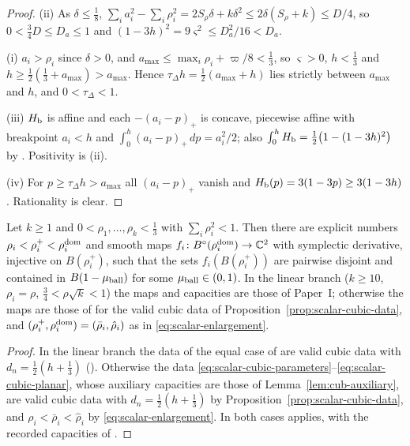 \begin{proof}
(ii) As $\delta\le\frac18$, $\sum_ia_i^2-\sum_i\rho_i^2=2S_\rho\delta+k\delta^2\le2\delta(S_\rho+k)\le D/4$, so $0<\frac34D\le D_a\le1$ and $(1-3h)^2=9\varsigma^2\le D_a^2/16<D_a$.

(i) $a_i>\rho_i$ since $\delta>0$, and $a_{\max}\le\max_i\rho_i+\varpi/8<\frac13$, so $\varsigma>0$, $h<\frac13$ and $h\ge\frac12(\frac13+a_{\max})>a_{\max}$. Hence $\tau_\Delta h=\frac12(a_{\max}+h)$ lies strictly between $a_{\max}$ and $h$, and $0<\tau_\Delta<1$.

(iii) $H_{\mathrm b}$ is affine and each $-(a_i-p)_+$ is concave, piecewise affine with breakpoint $a_i<h$ and $\int_0^h(a_i-p)_+\,dp=a_i^2/2$; also $\int_0^hH_{\mathrm b}=\frac12\big(1-(1-3h)^2\big)$ by . Positivity is (ii).

(iv) For $p\ge\tau_\Delta h>a_{\max}$ all $(a_i-p)_+$ vanish and $H_{\mathrm b}(p)=3(1-3p)\ge3(1-3h)$. Rationality is clear.
\end{proof}

\begin{theorem}\label{thm:cub-packing-general}
Let $k\ge1$ and $0<\rho_1,\dots,\rho_k<\frac13$ with $\sum_i\rho_i^2<1$. Then there are explicit numbers
$\rho_i<\rho_i^+<\rho_i^{\rm dom}$ and smooth maps $f_i\colon B^{\circ}(\rho_i^{\rm dom})\to\mathbb{C}^2$ with symplectic derivative,
injective on $B(\rho_i^+)$, such that the sets $f_i(B(\rho_i^+))$ are pairwise disjoint and contained in
$B(1-\mu_{\rm ball})$ for some $\mu_{\rm ball}\in(0,1)$. In the linear branch ($k\ge10$, $\rho_i=\rho$,
$\frac34<\rho\sqrt k<1$) the maps and capacities are those of Paper~I; otherwise the maps are those of
 for the valid cubic data of Proposition~\ref{prop:scalar-cubic-data}, and
$(\rho_i^+,\rho_i^{\rm dom})=(\bar\rho_i,\hat\rho_i)$ as in \eqref{eq:scalar-enlargement}.
\end{theorem}

\begin{proof}
In the linear branch the data of the equal case of  are valid cubic data with
$d_n=\frac12(h+\frac13)$ (). Otherwise the data
\eqref{eq:scalar-cubic-parameters}--\eqref{eq:scalar-cubic-planar}, whose auxiliary capacities are those of
Lemma~\ref{lem:cub-auxiliary}, are valid cubic data with $d_n=\frac12(h+\frac13)$ by
Proposition~\ref{prop:scalar-cubic-data}, and $\rho_i<\bar\rho_i<\hat\rho_i$ by \eqref{eq:scalar-enlargement}. In both cases
 applies, with the recorded capacities of .
\end{proof}

